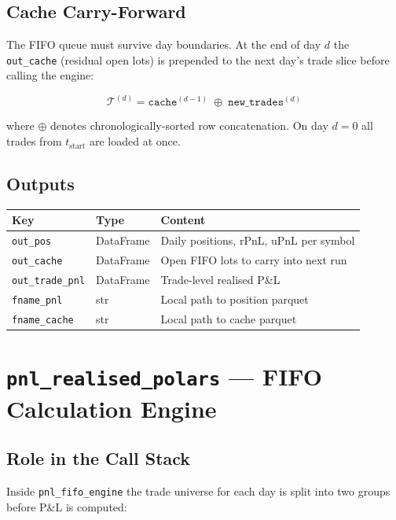 \documentclass[11pt, a4paper]{article}
\begin{document}
\subsection{Cache Carry-Forward}

The FIFO queue must survive day boundaries.
At the end of day $d$ the \texttt{out\_cache} (residual open lots)
is prepended to the next day's trade slice before calling the engine:

\begin{equation}
  \mathcal{T}^{(d)} = \texttt{cache}^{(d-1)} \;\oplus\; \texttt{new\_trades}^{(d)}
\end{equation}

where $\oplus$ denotes chronologically-sorted row concatenation.
On day $d=0$ all trades from $t_{\text{start}}$ are loaded at once.

\subsection{Outputs}

\begin{tabular}{@{}lll@{}}
  \toprule
  Key                   & Type      & Content \\
  \midrule
  \texttt{out\_pos}        & DataFrame & Daily positions, rPnL, uPnL per symbol \\
  \texttt{out\_cache}      & DataFrame & Open FIFO lots to carry into next run \\
  \texttt{out\_trade\_pnl} & DataFrame & Trade-level realised P\&L \\
  \texttt{fname\_pnl}      & str       & Local path to position parquet \\
  \texttt{fname\_cache}    & str       & Local path to cache parquet \\
  \bottomrule
\end{tabular}

\section{\texttt{pnl\_realised\_polars} — FIFO Calculation Engine}

\subsection{Role in the Call Stack}

Inside \texttt{pnl\_fifo\_engine} the trade universe for each day is
split into two groups before P\&L is computed:
\end{document}
